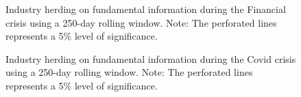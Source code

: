 \documentclass[
  letterpaper,
  DIV=11,
  numbers=noendperiod]{scrartcl}
\begin{document}
\begin{figure}[H]


\caption{\label{fig-rol_fundamental_fc}Industry herding on fundamental
information during the Financial crisis using a 250-day rolling window.
Note: The perforated lines represents a 5\% level of significance.}

\end{figure}%

\begin{figure}[H]


\caption{\label{fig-rol_fundamental_cv}Industry herding on fundamental
information during the Covid crisis using a 250-day rolling window.
Note: The perforated lines represents a 5\% level of significance.}

\end{figure}%
\end{document}
